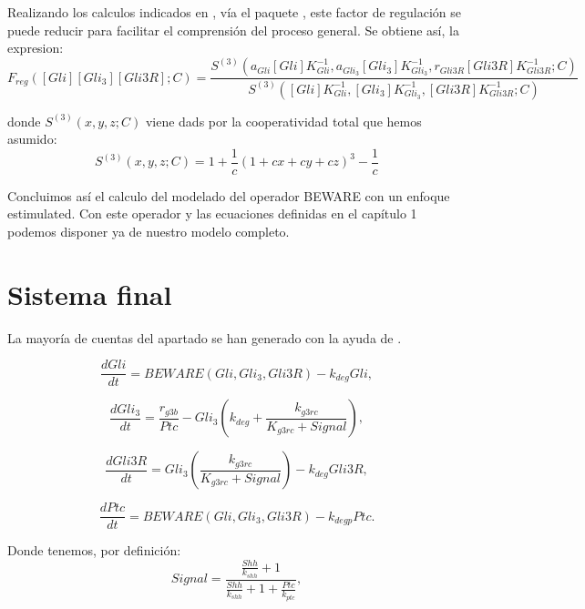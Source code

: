Realizando los calculos indicados en \cite{cambon1}, vía el paquete \cite{sympy}, este factor de regulación se puede reducir para facilitar el
comprensión del proceso general. Se obtiene así, la expresion:
\begin{equation}
F_{reg}([Gli][Gli_3][Gli3R];C)=\frac{S^{(3)}(a_{Gli}[Gli]K_{Gli}^{-1},a_{Gli_3}[Gli_3]K_{Gli_3}^{-1},r_{Gli3R}[Gli3R]K_{Gli3R}^{-1};C)}{S^{(3)}([Gli]K_{Gli}^{-1},[Gli_3]K_{Gli_3}^{-1},[Gli3R]K_{Gli3R}^{-1};C)}
\end{equation}

donde $S^{(3)}(x,y,z;C)$ viene dads por la cooperatividad total que hemos asumido:
\begin{equation}
S^{(3)}(x,y,z;C)=1 + \frac{1}{c} \left(1+cx+cy+cz\right)^{3} - \frac{1}{c}
\end{equation}

Concluimos así el calculo del modelado del operador BEWARE con un enfoque estimulated. Con este operador y las ecuaciones definidas en el capítulo 1 podemos disponer ya de nuestro modelo completo.

\section{Sistema final}

La mayoría de cuentas del apartado se han generado con la ayuda de \cite{sympy}.

\begin{equation}
\frac{dGli}{dt} = BEWARE(Gli, Gli_3, Gli3R)-k_{deg}Gli,
\label{equ:12}
\end{equation}

\begin{equation}
\frac{dGli_3}{dt} = \frac{r_{g3b}}{Ptc}-Gli_3\left(k_{deg}+\frac{k_{g3rc}}{K_{g3rc}+Signal}\right),
\label{eq:22}
\end{equation}

\begin{equation}
\frac{dGli3R}{dt}= Gli_3\left(\frac{k_{g3rc}}{K_{g3rc}+Signal}\right)-k_{deg}Gli3R,
\label{eq:32}
\end{equation}

\begin{equation}
\frac{dPtc}{dt} = BEWARE(Gli, Gli_3, Gli3R)-k_{degp}Ptc.
\label{eq:42}
\end{equation}


Donde tenemos, por definición:
 \begin{equation}
Signal=\frac{\frac{Shh}{k_{shh}} + 1}{\frac{Shh}{k_{shh}} + 1 + \frac{Ptc}{k_{ptc}}},
\label{signal} \end{equation}

